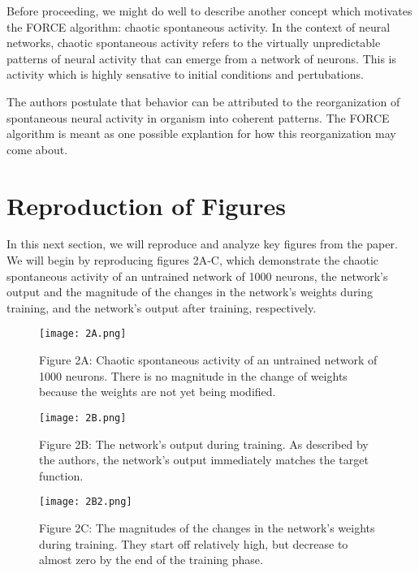 \documentclass{article}
\begin{document}
Before proceeding, we might do well to describe another concept which motivates the FORCE algorithm: chaotic spontaneous activity. In the context of neural networks, chaotic spontaneous activity refers to the virtually unpredictable patterns of neural activity that can emerge from a network of neurons. This is activity which is highly sensative to initial conditions and pertubations.
\vspace{1em}

The authors postulate that behavior can be attributed to the reorganization of spontaneous neural activity in organism into coherent patterns. The FORCE algorithm is meant as one possible explantion for how this reorganization may come about.
\vspace{1.5em}

\section*{Reproduction of Figures}
\vspace{.5em}

In this next section, we will reproduce and analyze key figures from the paper. We will begin by reproducing figures 2A-C, which demonstrate the chaotic spontaneous activity of an untrained network of 1000 neurons, the network's output and the magnitude of the changes in the network's weights during training, and the network's output after training, respectively.
\vspace{1em}

\begin{figure}[ht]
    \centering
    \texttt{[image: 2A.png]}
    \captionsetup{font=normalsize, width=1\textwidth, labelformat=empty}
    \caption{Figure 2A: Chaotic spontaneous activity of an untrained network of 1000 neurons. There is no magnitude in the change of weights because the weights are not yet being modified.}
\end{figure}

\begin{figure}[ht]
    \centering
    \texttt{[image: 2B.png]}
    \captionsetup{font=normalsize, width=1\textwidth, labelformat=empty}
    \caption{Figure 2B: The network's output during training. As described by the authors, the network's output immediately matches the target function.}
\end{figure}

\begin{figure}[ht]
    \centering
    \texttt{[image: 2B2.png]}
    \captionsetup{font=normalsize, width=1\textwidth, labelformat=empty}
    \caption{Figure 2C: The magnitudes of the changes in the network's weights during training. They start off relatively high, but decrease to almost zero by the end of the training phase.}
\end{figure}
\end{document}
